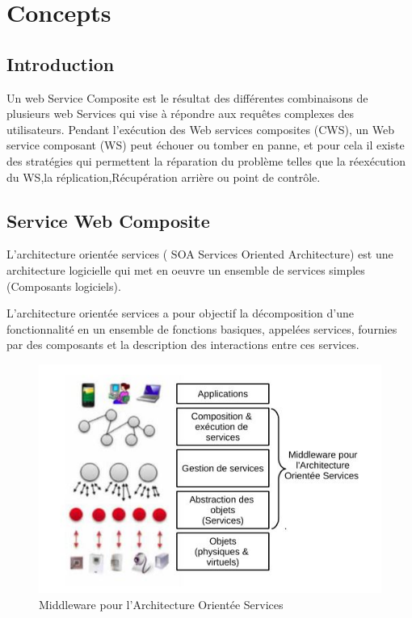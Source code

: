 
\chapter{Concepts}

\section{Introduction}

Un web Service Composite est  le résultat des différentes combinaisons de plusieurs web Services qui vise à répondre aux requêtes complexes des utilisateurs.
Pendant l'exécution des Web services composites (CWS), un Web service composant (WS) peut échouer ou tomber en panne, et pour cela il existe des stratégies qui permettent la réparation du problème telles que  la réexécution du WS,la réplication,Récupération arrière ou point de contrôle.

\section{Service Web Composite}

L'architecture orientée services ( SOA Services Oriented Architecture) est une architecture logicielle qui met en oeuvre un ensemble de services simples (Composants logiciels).

L'architecture orientée services a pour objectif la décomposition d'une fonctionnalité en un ensemble de fonctions basiques, appelées services, fournies par des composants et la description des interactions entre ces services.


\begin{figure}[H]
\begin{center}
\includegraphics[width=1\linewidth]{images/MiddlewareSOA.jpg}
\end{center}
\caption{Middleware pour l’Architecture Orientée Services}
\label{fig:1}
\end{figure}

